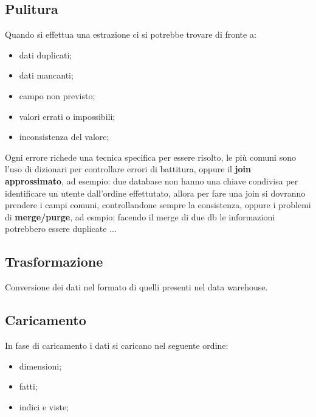\documentclass[12pt]{article}
\begin{document}
\subsection{Pulitura}
Quando si effettua una estrazione ci si potrebbe trovare di fronte a:
\begin{itemize}
    \item dati duplicati;
    \item dati mancanti;
    \item campo non previsto;
    \item valori errati o impossibili;
    \item inconsistenza del valore;
\end{itemize}
Ogni errore richede una tecnica specifica per essere risolto, le pi\`u comuni sono l'uso di dizionari per controllare errori di battitura, oppure il \textbf{join approssimato}, ad esempio: due database non hanno una chiave condivisa per identificare un utente dall'ordine effettutato, allora per fare una join si dovranno prendere i campi comuni, controllandone sempre la consistenza, oppure i problemi di \textbf{merge/purge}, ad esmpio: facendo il merge di due db le informazioni potrebbero essere duplicate ...

\subsection{Trasformazione}
Conversione dei dati nel formato di quelli presenti nel data warehouse.

\subsection{Caricamento}
In fase di caricamento i dati si caricano nel seguente ordine:
\begin{itemize}
    \item dimensioni;
    \item fatti;
    \item indici e viste;
\end{itemize}
\end{document}
